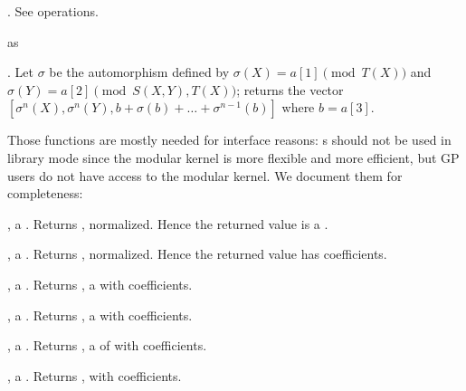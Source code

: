 . See  operations.





as 

. Let
$\sigma$ be the automorphism defined by $\sigma(X)=a[1]\pmod{T(X)}$ and
$\sigma(Y)=a[2]\pmod{S(X,Y),T(X)}$; returns the vector
$[\sigma^n(X),\sigma^n(Y),b+\sigma(b)+\ldots+\sigma^{n-1}(b)]$
where $b=a[3]$.


Those functions are mostly needed for interface reasons: s should
not be used in library mode since the modular kernel is more flexible and more
efficient, but GP users do not have access to the modular kernel.
We document them for completeness:

,  a . Returns , normalized. Hence the returned value is a .

,  a . Returns , normalized. Hence the returned value has  coefficients.

,  a . Returns , a  with  coefficients.

,  a . Returns , a  with  coefficients.

,  a . Returns , a  of  with  coefficients.

,  a . Returns , with  coefficients.





